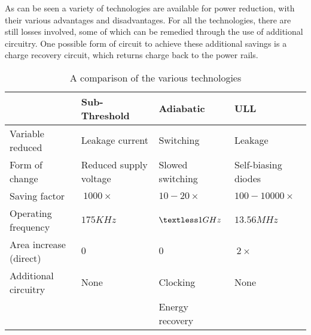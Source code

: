 As can be seen a variety of technologies are available for power reduction, with their various advantages and disadvantages.
For all the technologies, there are still losses involved, some of which can be remedied through the use of additional circuitry.
One possible form of circuit to achieve these additional savings is a charge recovery circuit, which returns charge back to the power rails.

\begin{table}[htbp]
	\centering
	\begin{tabular}{| l | p{165px} | p{165px} | p{165px} |}
		\hline
					& Sub-Threshold			& Adiabatic		& ULL					\\
		\hline
		Variable reduced	& Leakage current		& Switching		& Leakage				\\
		Form of change		& Reduced supply voltage	& Slowed switching	& Self-biasing diodes			\\
		Saving factor 		& $~1000\times$			& $10-20\times$		& $100-10000\times$			\\
		Operating frequency	& $175KHz$			& $\textless 1GHz$	& $13.56MHz$				\\
		Area increase (direct)	& $0$				& $0$			& $~2\times$				\\
		Additional circuitry	& None				& Clocking		& None					\\
					& 				& Energy recovery	& 					\\
		\hline 
	\end{tabular}
	\caption{A comparison of the various technologies}
	\label{tab:comparison}
\end{table}
